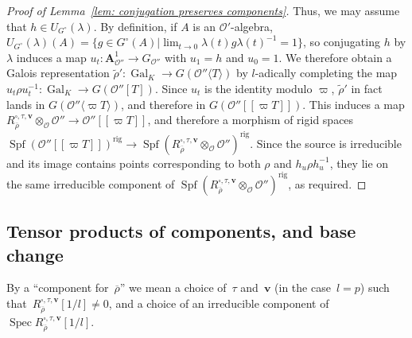 \documentclass{amsart}
\renewcommand{\mathbb}{\mathbf}
\theoremstyle{definition}
\theoremstyle{remark}
\newcommand{\mar}[1]{}
\newcommand{\mar}[1]{\marginpar{\raggedright\tiny squirrel #1}}
\newcommand{\A}{\AA}
\renewcommand{\AA}{{\mathbb A}}
\newcommand{\cO}{{\mathcal O}}
\DeclareMathOperator{\Gal}{Gal}
\DeclareMathOperator{\GL}{GL}
\DeclareMathOperator{\Spec}{Spec}
\DeclareMathOperator{\Spf}{Spf}
\newcommand{\rhobar}{\overline{\rho}}
\begin{document}
\begin{proof}[Proof of Lemma~\ref{lem: conjugation preserves components}]
Thus, we may assume that $h\in U_{G^\circ}(\lambda)$.  By definition, if $A$
is an $\cO'$-algebra, $U_{G^\circ}(\lambda)(A)=\{g\in G^\circ(A) |
\lim_{t\rightarrow 0}\lambda(t)g\lambda(t)^{-1}=1\}$, so conjugating
$h$ by $\lambda$ induces a map $u_t:\A_{\cO''}^1\rightarrow G_{\cO''}$
with $u_1=h$ and $u_0=1$.  We therefore obtain a Galois representation
$\widetilde\rho':\Gal_K\rightarrow G(\cO''\langle T\rangle)$ by
$l$-adically completing the map $u_t\rho u_t^{-1}:\Gal_K\rightarrow
G(\cO''[T])$.  Since $u_t$ is the identity modulo $\varpi$,
$\widetilde\rho'$ in fact lands in $G(\cO''\langle \varpi T\rangle)$, and
therefore in $G(\cO''[\![\varpi T]\!])$.  This induces a map
$R_{\rhobar}^{\square,\tau,\mathbf{v}}\otimes_{\cO}\cO''\rightarrow \cO''[\![\varpi T]\!]$,
and therefore a morphism of rigid spaces
$\Spf(\cO''[\![\varpi T]\!])^{\mathrm{rig}}\rightarrow\Spf(R_{\rhobar}^{\square,\tau,\mathbf{v}}\otimes_{\cO}\cO'')^{\mathrm{rig}}$.
Since the source is irreducible and its image contains points
corresponding to both $\rho$ and $h_u\rho h_u^{-1}$, they lie on the
same irreducible component of
$\Spf(R_{\rhobar}^{\square,\tau,\mathbf{v}}\otimes_{\cO}\cO'')^{\mathrm{rig}}$, as required.%
\end{proof}





\subsection{Tensor products of components, and base change}\label{subsec: tensor
  products of components}%
By a ``component for~$\rhobar$'' we mean a choice of~$\tau$
and~$\mathbf{v}$ (in the case~$l=p$) such
that~$R_{\rhobar}^{\square,\tau,\mathbf{v}}[1/l]\ne 0$, and a choice of an
irreducible component
of~$\Spec R_{\rhobar}^{\square,\tau,\mathbf{v}}[1/l]$. 
\end{document}
